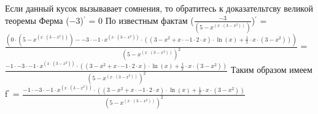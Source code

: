 \documentclass{article}
\begin{document}
\newline
Если данный кусок вызывавает сомнения, то обратитесь к доказательтсву великой теоремы Ферма \newline
($ -3 $)$ ^\prime $ = $ 0 $\newline
\newline
По известным фактам \newline
($ \frac{-3}{(5 - {x}^{(x \cdot (3 - {x}^{2}))})} $)$ ^\prime $ = $ \frac{(0 \cdot (5 - {x}^{(x \cdot (3 - {x}^{2}))}) - -3 \cdot -1 \cdot {x}^{(x \cdot (3 - {x}^{2}))} \cdot ((3 - {x}^{2} + x \cdot -1 \cdot 2 \cdot x) \cdot \ln{(x)} + \frac{1}{x} \cdot x \cdot (3 - {x}^{2})))}{{(5 - {x}^{(x \cdot (3 - {x}^{2}))})}^{2}} $ = $ \frac{-1 \cdot -3 \cdot -1 \cdot {x}^{(x \cdot (3 - {x}^{2}))} \cdot ((3 - {x}^{2} + x \cdot -1 \cdot 2 \cdot x) \cdot \ln{(x)} + \frac{1}{x} \cdot x \cdot (3 - {x}^{2}))}{{(5 - {x}^{(x \cdot (3 - {x}^{2}))})}^{2}} $\newline
\newline
Таким образом имеем f$^\prime$ = $ \frac{-1 \cdot -3 \cdot -1 \cdot {x}^{(x \cdot (3 - {x}^{2}))} \cdot ((3 - {x}^{2} + x \cdot -1 \cdot 2 \cdot x) \cdot \ln{(x)} + \frac{1}{x} \cdot x \cdot (3 - {x}^{2}))}{{(5 - {x}^{(x \cdot (3 - {x}^{2}))})}^{2}} $\newline
\end{document}
